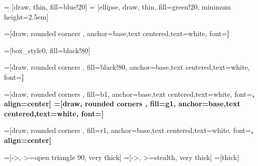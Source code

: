 \usepackage[utf8]{inputenc}
\usepackage{lmodern}
\usepackage[T1]{fontenc}
\usepackage{mathenv}
\usepackage{array}
\usepackage{amsmath}
\usepackage{mathtools}%
\usepackage{wasysym}
\usepackage{amsfonts}
\usepackage{amssymb, amsbsy}
\usepackage[utf8]{inputenc}
\usepackage{graphicx}
\usepackage{multimedia}
\usepackage{multicol}
\usepackage{multirow}
\usepackage{fourier}
\usepackage{makecell}



\usepackage{eurosym}

\usepackage{color}

\usepackage{cancel}
\usepackage{enumitem}

\usepackage{tikz}
\usetikzlibrary{shapes,arrows,shadows,calc}
\usetikzlibrary{arrows,shapes}
\usetikzlibrary{positioning}

\usepackage{verbatim}

 = [draw, thin, fill=blue!20]
 = [ellipse, draw, thin, fill=green!20, minimum height=2.5em]


=[draw, rounded corners ,
anchor=base,text centered,text=white, font=\bfseries] %

=[box_style0, fill=black!80] %

=[draw, rounded corners , fill=black!80,
anchor=base,text centered,text=white, font=\bfseries] %

=[draw, rounded corners , fill=b1,
anchor=base,text centered,text=white, font=\bfseries, align=center] %
=[draw, rounded corners , fill=g1,
anchor=base,text centered,text=white, font=\bfseries] %

=[draw, rounded corners , fill=r1,
anchor=base,text centered,text=white, font=\bfseries, align=center] %

=[->, >=open triangle 90, very thick]
=[->, >=stealth, very thick]
=[thick]



